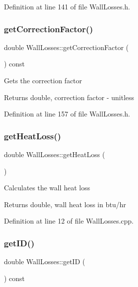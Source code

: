 Definition at line 141 of file Wall\+Losses.\+h.

\mbox{\label{class_wall_losses_a4ce6a0ec36cd868b14b041f18251cb6d}} 
\subsubsection{\texorpdfstring{get\+Correction\+Factor()}{getCorrectionFactor()}}
{\footnotesize\ttfamily double Wall\+Losses\+::get\+Correction\+Factor (\begin{DoxyParamCaption}{ }\end{DoxyParamCaption}) const\hspace{0.3cm}{\ttfamily [inline]}}

Gets the correction factor \begin{DoxyReturn}{Returns}
double, correction factor -\/ unitless 
\end{DoxyReturn}


Definition at line 157 of file Wall\+Losses.\+h.

\mbox{\label{class_wall_losses_a884da3507498878f619cbe5ba340c0ef}} 
\subsubsection{\texorpdfstring{get\+Heat\+Loss()}{getHeatLoss()}}
{\footnotesize\ttfamily double Wall\+Losses\+::get\+Heat\+Loss (\begin{DoxyParamCaption}{ }\end{DoxyParamCaption})}

Calculates the wall heat loss \begin{DoxyReturn}{Returns}
double, wall heat loss in btu/hr 
\end{DoxyReturn}


Definition at line 12 of file Wall\+Losses.\+cpp.

\mbox{\label{class_wall_losses_ad67b46094ba89cb759ec124c63c137de}} 
\subsubsection{\texorpdfstring{get\+I\+D()}{getID()}}
{\footnotesize\ttfamily double Wall\+Losses\+::get\+ID (\begin{DoxyParamCaption}{ }\end{DoxyParamCaption}) const\hspace{0.3cm}{\ttfamily [inline]}}

